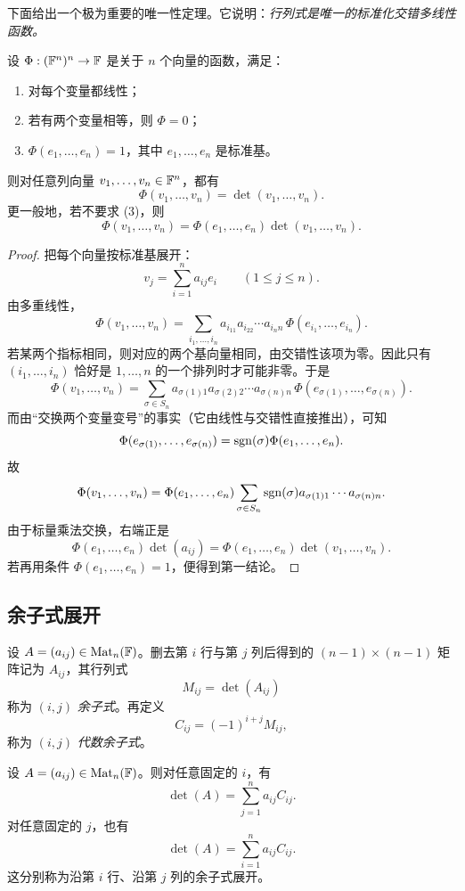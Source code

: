 下面给出一个极为重要的唯一性定理。它说明：\emph{行列式是唯一的标准化交错多线性函数。}

\begin{theorem}[行列式的刻画]
设 $\Phi:(\mathbb{F}^n)^n\to\mathbb{F}$ 是关于 $n$ 个向量的函数，满足：
\begin{enumerate}[label=(\arabic*)]
  \item 对每个变量都线性；
  \item 若有两个变量相等，则 $\Phi=0$；
  \item $\Phi(e_1,\dots,e_n)=1$，其中 $e_1,\dots,e_n$ 是标准基。
\end{enumerate}
则对任意列向量 $v_1,\dots,v_n\in\mathbb{F}^n$，都有
\[
\Phi(v_1,\dots,v_n)=\det(v_1,\dots,v_n).
\]
更一般地，若不要求 (3)，则
\[
\Phi(v_1,\dots,v_n)=\Phi(e_1,\dots,e_n)\det(v_1,\dots,v_n).
\]
\end{theorem}

\begin{proof}
把每个向量按标准基展开：
\[
v_j=\sum_{i=1}^n a_{ij}e_i\qquad (1\le j\le n).
\]
由多重线性，
\[
\Phi(v_1,\dots,v_n)=\sum_{i_1,\dots,i_n}a_{i_11}a_{i_22}\cdots a_{i_nn}\,\Phi(e_{i_1},\dots,e_{i_n}).
\]
若某两个指标相同，则对应的两个基向量相同，由交错性该项为零。因此只有 $(i_1,\dots,i_n)$ 恰好是 $1,\dots,n$ 的一个排列时才可能非零。于是
\[
\Phi(v_1,\dots,v_n)=\sum_{\sigma\in S_n}a_{\sigma(1)1}a_{\sigma(2)2}\cdots a_{\sigma(n)n}\,\Phi(e_{\sigma(1)},\dots,e_{\sigma(n)}).
\]
而由“交换两个变量变号”的事实（它由线性与交错性直接推出），可知
\[
\Phi(e_{\sigma(1)},\dots,e_{\sigma(n)})=\operatorname{sgn}(\sigma)\Phi(e_1,\dots,e_n).
\]
故
\[
\Phi(v_1,\dots,v_n)=\Phi(e_1,\dots,e_n)\sum_{\sigma\in S_n}\operatorname{sgn}(\sigma)a_{\sigma(1)1}\cdots a_{\sigma(n)n}.
\]
由于标量乘法交换，右端正是
\[
\Phi(e_1,\dots,e_n)\det(a_{ij})=
\Phi(e_1,\dots,e_n)\det(v_1,\dots,v_n).
\]
若再用条件 $\Phi(e_1,\dots,e_n)=1$，便得到第一结论。
\end{proof}

\subsection{余子式展开}

\begin{definition}
设 $A=(a_{ij})\in\mathrm{Mat}_n(\mathbb{F})$。删去第 $i$ 行与第 $j$ 列后得到的 $(n-1)\times(n-1)$ 矩阵记为 $A_{ij}$，其行列式
\[
M_{ij}=\det(A_{ij})
\]
称为 $(i,j)$ \emph{余子式}。再定义
\[
C_{ij}=(-1)^{i+j}M_{ij},
\]
称为 $(i,j)$ \emph{代数余子式}。
\end{definition}

\begin{theorem}[按行按列展开]
设 $A=(a_{ij})\in\mathrm{Mat}_n(\mathbb{F})$。则对任意固定的 $i$，有
\[
\det(A)=\sum_{j=1}^n a_{ij}C_{ij}.
\]
对任意固定的 $j$，也有
\[
\det(A)=\sum_{i=1}^n a_{ij}C_{ij}.
\]
这分别称为沿第 $i$ 行、沿第 $j$ 列的余子式展开。
\end{theorem}

